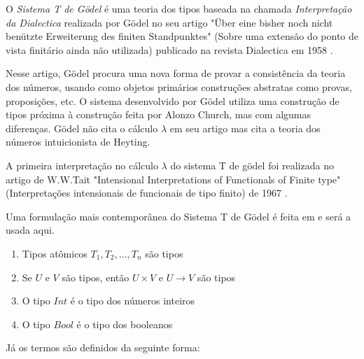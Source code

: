 \documentclass[../main.tex]{subfiles}
\begin{document}
O \emph{Sistema T de Gödel} é uma teoria dos tipos baseada na chamada \emph{Interpretação da Dialectica} realizada por Gödel no seu artigo "Über eine bisher noch nicht benützte Erweiterung des finiten Standpunktes" (Sobre uma extensão do ponto de vista finitário ainda não utilizada) publicado na revista Dialectica em 1958 \cite{godel1980}.

Nesse artigo, Gödel procura uma nova forma de provar a consistência da teoria dos números, usando como objetos primários construções abstratas como provas, proposições, etc. O sistema desenvolvido por Gödel utiliza uma construção de tipos próxima à construção feita por Alonzo Church, mas com algumas diferenças. Gödel não cita o cálculo $\lambda$ em seu artigo mas cita a teoria dos números intuicionista de Heyting.

A primeira interpretação no cálculo $\lambda$ do sistema T de gödel foi realizada no artigo de W.W.Tait "Intensional Interpretations of Functionals of Finite type" (Interpretações intensionais de funcionais de tipo finito) de 1967 \cite{tait1967}.

Uma formulação mais contemporânea do Sistema T de Gödel é feita em \cite{girard1989} e será a usada aqui.

\begin{definition}
    \hfill
    \begin{enumerate}
        \item Tipos atômicos $T_1, T_2, \dots, T_n$ são tipos
        \item Se $U$ e $V$ são tipos, então $U \times V$ e $U \to V$ são tipos
        \item O tipo $Int$ é o tipo dos números inteiros
        \item O tipo $Bool$ é o tipo dos booleanos
    \end{enumerate}
\end{definition}

Já os termos são definidos da seguinte forma:
\end{document}
